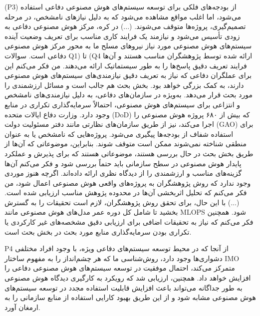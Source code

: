 \documentclass[a4paper,10pt]{article}
\begin{document}
                    \begin{addinfo}
                        
                        (P3) از بودجه‌های فلکی برای توسعه سیستم‌های هوش مصنوعی دفاعی استفاده می‌شود، اما اغلب مواقع مشاهده می‌شود که به دلیل نیازهای نامشخص، در مرحله تصمیم‌گیری، پروژه‌ها متوقف می‌شوند. (...) در کره، مرکز هوش مصنوعی دفاعی به زودی تأسیس می‌شود و نیازمند یک فرایند کاری مناسب برای تعریف وضعیت آینده سیستم‌های هوش مصنوعی مورد نیاز نیروهای مسلح ما به محور مرکز هوش مصنوعی دفاعی است. سوالات Q1) تا (Q4 ارائه شده توسط پژوهشگران مناسب هستند و آن‌ها فرایند تعریف دقیق پاسخ‌ها را به طور سیستماتیک ارائه می‌دهند. من فکر می‌کنم این برای عملگران دفاعی که نیاز به تعریف دقیق نیازمندی‌های سیستم‌های هوش مصنوعی دارند، به کمک بزرگی خواهد بود. بخش بحث هم جالب است و مسائل ارزشمندی را مورد بحث قرار می‌دهد. به‌ویژه در سازمان‌های دفاعی، به دلیل نیازمندی‌های نامشخص و انتزاعی برای سیستم‌های هوش مصنوعی، احتمالاً سرمایه‌گذاری تکراری در منابع وجود دارد. وزارت دفاع ایالات متحده (DoD) که بیش از ۶۸۰ پروژه هوش مصنوعی را اجرا می‌کند، نیز از طریق سازمان‌های نظارتی مانند دفتر مسئولیت دولت (GAO) برای استفاده شفاف از بودجه‌ها پیگیری می‌شود. پروژه‌هایی که نامشخص یا به عنوان منطقی شناخته نمی‌شوند ممکن است متوقف شوند. بنابراین، موضوعاتی که آن‌ها از طریق بخش بحث در حال بررسی هستند، موضوعاتی هستند که برای پذیرش و عملکرد پایدار هوش مصنوعی در سطح سازمانی باید حتماً بررسی شود و فکر می‌کنم آن‌ها گزینه‌های مناسب و ارزشمندی را از دیدگاه نظری ارائه داده‌اند. اگرچه هنوز موردی وجود ندارد که روش پژوهشگران به پروژه‌های واقعی هوش مصنوعی اعمال شود، من فکر می‌کنم که تحلیل اثربخشی آن‌ها در محدوده پژوهش مناسب ارزیابی شده است. (...) با این حال، برای تحقق روش پژوهشگران، لازم است تحقیقات را به گسترش بخشید تا شامل کل دوره عمر مدل‌های هوش مصنوعی مانند MLOPS شود. همچنین فکر می‌کنم که نیاز به تحقیقات اضافی برای ارزیابی دقیق مشخصه‌های غیر کارکردی یا تکراری بودن سرمایه‌گذاری منابع مورد بحث در بخش بحث است.
                        
                    \end{addinfo}

                    P4 از آنجا که در محیط توسعه سیستم‌های دفاعی ویژه، با وجود افراد مختلفی دشواری‌ها وجود دارد، روش‌شناسی ما که هر چشم‌انداز را به مفهوم ساختار IMO متمرکز می‌کند، احتمال موفقیت در توسعه سیستم‌های هوش مصنوعی دفاعی را افزایش خواهد داد. همچنین، ارزیابی شد که رویکرد به کارگیری دیدگاه هوش مصنوعی به طور جداگانه می‌تواند باعث افزایش قابلیت استفاده مجدد در توسعه سیستم‌های هوش مصنوعی مشابه شود و از این طریق بهبود کارایی استفاده از منابع سازمانی را به ارمغان آورد.
\end{document}
